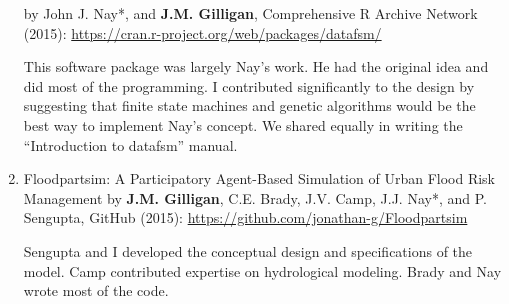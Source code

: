 \begin{enumerate}
by John J. Nay*, and \textbf{J.M. Gilligan}, 
Comprehensive R Archive Network (2015): \url{https://cran.r-project.org/web/packages/datafsm/}
\begin{credit}
    This software package was largely Nay's work. He had the original idea and did most of the programming. I contributed significantly to the design by suggesting that finite state machines and genetic algorithms would be the best way to implement Nay's concept. We shared equally in writing the ``Introduction to datafsm'' manual.
\end{credit}
%
\item
Floodpartsim: A Participatory Agent-Based Simulation of Urban Flood Risk Management
by \textbf{J.M. Gilligan}, C.E. Brady, J.V. Camp, J.J. Nay*, and P. Sengupta,
GitHub (2015): \url{https://github.com/jonathan-g/Floodpartsim}
\begin{credit}
    Sengupta and I developed the conceptual design and specifications of the model. Camp contributed expertise on hydrological modeling.
    Brady and Nay wrote most of the code.
\end{credit}
%    
\end{enumerate}


